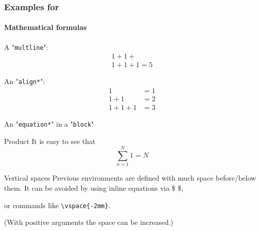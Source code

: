 \documentclass{beamer}
\begin{document}
	\begin{frame}
		\frametitle{Examples for}
		\framesubtitle{Mathematical formulas}
		
		A "\texttt{multline}":
		\begin{multline}
		1 + 1+ \\ 1+ 1 + 1 = 5
		\end{multline}
		
		An "\texttt{align*}":
		\begin{align*}
		 1 &= 1 \\
		 1+1&=2 \\
		 1+1+1 &= 3
		\end{align*}
		
		An "\texttt{equation*}" in a "\texttt{block}"
		\begin{block}{Product}
			It is easy to see that
			\begin{equation*}
				\sum_{n=1}^N 1 = N
			\end{equation*}
		\end{block}
		
	\end{frame}
	
	\begin{frame}{Vertical spaces}
		Previous environments are defined with much space before/below them. It can be avoided by using inline equations via \$ \$,
		
		\vspace{3mm}
		
		or commands like \texttt{\textbackslash vspace\{-2mm\}}.
		
		\vspace{3mm}
		
		(With positive arguments the space can be increased.)
	\end{frame}
	
\end{document}
